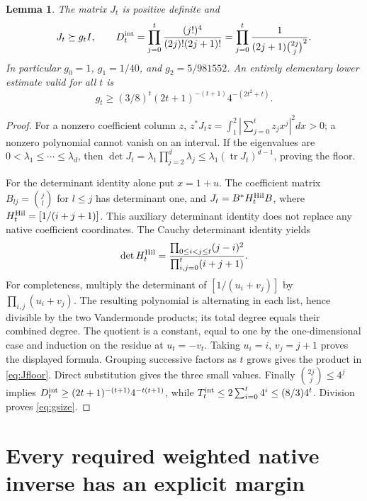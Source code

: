 \documentclass[11pt]{article}
\newtheorem{lemma}[theorem]{Lemma}
\newcommand{\tr}{\operatorname{tr}}
\begin{document}
\begin{lemma}\label{lem:J}
The matrix $J_t$ is positive definite and
\begin{equation}\label{eq:Jfloor}
 J_t\succeq g_tI,\qquad
 D_t^{\rm int}=\prod_{j=0}^t
 \frac{(j!)^4}{(2j)!(2j+1)!}
 =\prod_{j=0}^t\frac1{(2j+1)\binom{2j}j^2}.
\end{equation}
In particular $g_0=1$, $g_1=1/40$, and $g_2=5/981552$.
An entirely elementary lower estimate valid for all $t$ is
\begin{equation}\label{eq:gsize}
 g_t\ge(3/8)^t(2t+1)^{-(t+1)}4^{-(2t^2+t)}.
\end{equation}
\end{lemma}
\begin{proof}
For a nonzero coefficient column $z$,
$z^*J_tz=\int_1^2|\sum_{j=0}^tz_jx^j|^2dx>0$;
a nonzero polynomial cannot vanish on an interval. If the eigenvalues
are $0<\lambda_1\le\cdots\le\lambda_d$, then
$\det J_t=\lambda_1\prod_{j=2}^d\lambda_j
\le\lambda_1(\tr J_t)^{d-1}$, proving the floor.

For the determinant identity alone put $x=1+u$. The coefficient
matrix $B_{lj}=\binom jl$ for $l\le j$ has determinant one, and
$J_t=B^*H_t^{\rm Hil}B$, where
$H_t^{\rm Hil}=[1/(i+j+1)]$. This auxiliary determinant identity
does not replace any native coefficient coordinates. The Cauchy
determinant identity yields
\[
 \det H_t^{\rm Hil}
 =\frac{\prod_{0\le i<j\le t}(j-i)^2}
 {\prod_{i,j=0}^t(i+j+1)}.
\]
For completeness, multiply the determinant of $[1/(u_i+v_j)]$
by $\prod_{i,j}(u_i+v_j)$. The resulting polynomial is alternating
in each list, hence divisible by the two Vandermonde products;
its total degree equals their combined degree. The quotient is a
constant, equal to one by the one-dimensional case and induction
on the residue at $u_t=-v_t$. Taking $u_i=i$, $v_j=j+1$ proves
the displayed formula. Grouping successive factors as $t$ grows
gives the product in \eqref{eq:Jfloor}. Direct substitution gives
the three small values. Finally $\binom{2j}j\le4^j$ implies
$D_t^{\rm int}\ge(2t+1)^{-(t+1)}4^{-t(t+1)}$, while
$T_t^{\rm int}\le2\sum_{i=0}^t4^i\le(8/3)4^t$.
Division proves \eqref{eq:gsize}.
\end{proof}

\section{Every required weighted native inverse has an explicit margin}
\end{document}
